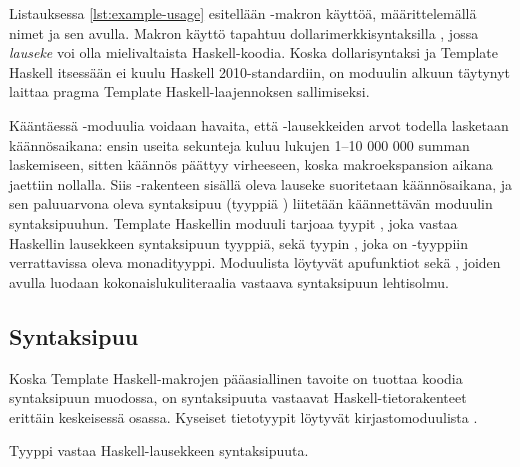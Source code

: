 Listauksessa \ref{lst:example-usage} esitellään -makron käyttöä,
määrittelemällä nimet  ja  sen avulla.
Makron käyttö tapahtuu dollarimerkkisyntaksilla ,
jossa \emph{lauseke} voi olla mielivaltaista Haskell-koodia.
Koska dollarisyntaksi ja Template Haskell itsessään ei kuulu Haskell 2010-standardiin,
on moduulin alkuun täytynyt laittaa pragma 
Template Haskell-laajennoksen sallimiseksi.

Kääntäessä -moduulia voidaan havaita,
että -lausekkeiden arvot todella lasketaan käännösaikana:
ensin useita sekunteja kuluu lukujen 1--10 000 000 summan laskemiseen,
sitten käännös päättyy virheeseen,
koska makroekspansion aikana jaettiin nollalla.
Siis \Haskell{\$()}-rakenteen sisällä oleva lauseke suoritetaan käännösaikana,
ja sen paluuarvona oleva syntaksipuu (tyyppiä ) liitetään käännettävän moduulin
syntaksipuuhun.
Template Haskellin moduuli  tarjoaa tyypit ,
joka vastaa Haskellin lausekkeen syntaksipuun tyyppiä,
sekä tyypin ,
joka on -tyyppiin verrattavissa oleva monadityyppi.
Moduulista  löytyvät apufunktiot 
sekä ,
joiden avulla luodaan kokonaislukuliteraalia vastaava syntaksipuun lehtisolmu.

\subsection{Syntaksipuu}
Koska Template Haskell-makrojen pääasiallinen tavoite on tuottaa koodia syntaksipuun muodossa,
on syntaksipuuta vastaavat Haskell-tietorakenteet erittäin keskeisessä osassa.
Kyseiset tietotyypit löytyvät kirjastomoduulista .

Tyyppi  vastaa Haskell-lausekkeen syntaksipuuta.

